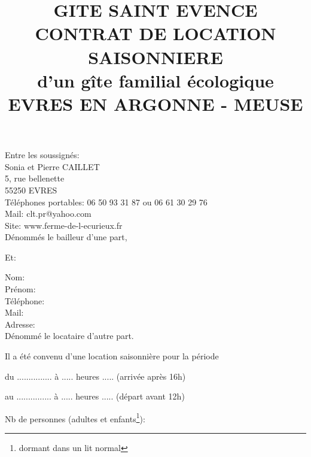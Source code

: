 \documentclass[a4paper,11pt]{article}
\title{GITE SAINT EVENCE\\CONTRAT DE LOCATION SAISONNIERE\\d’un gîte familial écologique\\EVRES EN ARGONNE - MEUSE}
\begin{document}
\date{}
\maketitle

\center Entre les soussignés:\\
\flushleft 
Sonia et Pierre CAILLET\\
5, rue bellenette\\
55250 EVRES\\                                                                                         
Téléphones portables: 06 50 93 31 87 ou 06 61 30 29 76 \\
Mail: clt.pr@yahoo.com\\
Site: www.ferme-de-l-ecurieux.fr\\

\vspace{0.5cm}
Dénommés le bailleur d’une part,                            

\center Et:

\flushleft
Nom:\\
Prénom:\\
Téléphone:\\
Mail:\\
Adresse:\\

\vspace{0.5cm}
Dénommé le locataire d'autre part.



\flushleft
Il a été convenu d'une location saisonnière pour la période
\vspace{0.5cm}

du   ...............   à .....    heures .....    (arrivée après 16h)
\vspace{0.5cm}

au   ...............   à .....    heures .....   (départ avant 12h)
\vspace{0.5cm}

Nb de personnes (adultes et enfants\footnote{dormant dans un lit normal}): 
\vspace{0.5cm}

\newpage{}




\vspace{0.5cm}
\end{document}

